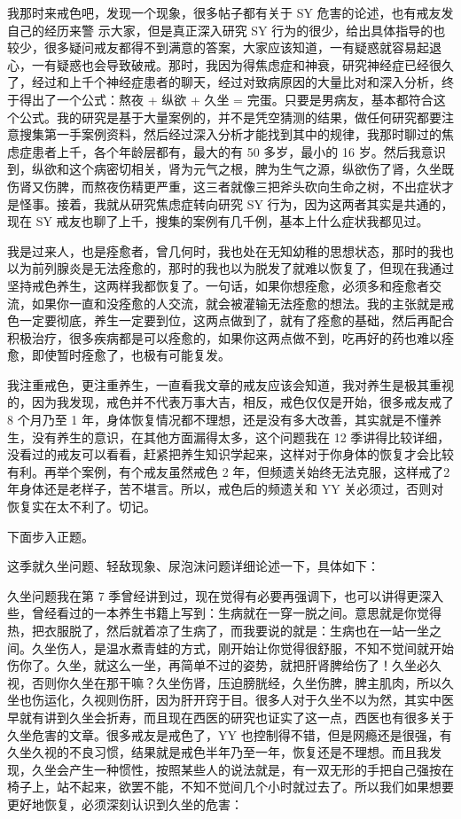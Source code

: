 \documentclass{ctexart}
\begin{document}
我那时来戒色吧，发现一个现象，很多帖子都有关于 SY 危害的论述，也有戒友发自己的经历来警 示大家，但是真正深入研究 SY 行为的很少，给出具体指导的也较少，很多疑问戒友都得不到满意的答案，大家应该知道，一有疑惑就容易起退心，一有疑惑也会导致破戒。那时，我因为得焦虑症和神衰，研究神经症已经很久了，经过和上千个神经症患者的聊天，经过对致病原因的大量比对和深入分析，终于得出了一个公式：熬夜 + 纵欲 + 久坐 = 完蛋。只要是男病友，基本都符合这个公式。我的研究是基于大量案例的，并不是凭空猜测的结果，做任何研究都要注意搜集第一手案例资料，然后经过深入分析才能找到其中的规律，我那时聊过的焦虑症患者上千，各个年龄层都有，最大的有 50 多岁，最小的 16 岁。然后我意识到，纵欲和这个病密切相关，肾为元气之根，脾为生气之源，纵欲伤了肾，久坐既伤肾又伤脾，而熬夜伤精更严重，这三者就像三把斧头砍向生命之树，不出症状才是怪事。接着，我就从研究焦虑症转向研究 SY 行为，因为这两者其实是共通的，现在 SY 戒友也聊了上千，搜集的案例有几千例，基本上什么症状我都见过。

我是过来人，也是痊愈者，曾几何时，我也处在无知幼稚的思想状态，那时的我也以为前列腺炎是无法痊愈的，那时的我也以为脱发了就难以恢复了，但现在我通过坚持戒色养生，这两样我都恢复了。一句话，如果你想痊愈，必须多和痊愈者交流，如果你一直和没痊愈的人交流，就会被灌输无法痊愈的想法。我的主张就是戒色一定要彻底，养生一定要到位，这两点做到了，就有了痊愈的基础，然后再配合积极治疗，很多疾病都是可以痊愈的，如果你这两点做不到，吃再好的药也难以痊愈，即使暂时痊愈了，也极有可能复发。

我注重戒色，更注重养生，一直看我文章的戒友应该会知道，我对养生是极其重视的，因为我发现，戒色并不代表万事大吉，相反，戒色仅仅是开始，很多戒友戒了 8 个月乃至 1 年，身体恢复情况都不理想，还是没有多大改善，其实就是不懂养生，没有养生的意识，在其他方面漏得太多，这个问题我在 12 季讲得比较详细，没看过的戒友可以看看，赶紧把养生知识学起来，这样对于你身体的恢复才会比较有利。再举个案例，有个戒友虽然戒色 2 年，但频遗关始终无法克服，这样戒了2年身体还是老样子，苦不堪言。所以，戒色后的频遗关和 YY 关必须过，否则对恢复实在太不利了。切记。

下面步入正题。

这季就久坐问题、轻敌现象、尿泡沫问题详细论述一下，具体如下：

久坐问题我在第 7 季曾经讲到过，现在觉得有必要再强调下，也可以讲得更深入些，曾经看过的一本养生书籍上写到：生病就在一穿一脱之间。意思就是你觉得热，把衣服脱了，然后就着凉了生病了，而我要说的就是：生病也在一站一坐之间。久坐伤人，是温水煮青蛙的方式，刚开始让你觉得很舒服，不知不觉间就开始伤你了。久坐，就这么一坐，再简单不过的姿势，就把肝肾脾给伤了！久坐必久视，否则你久坐在那干嘛？久坐伤肾，压迫膀胱经，久坐伤脾，脾主肌肉，所以久坐也伤运化，久视则伤肝，因为肝开窍于目。很多人对于久坐不以为然，其实中医早就有讲到久坐会折寿，而且现在西医的研究也证实了这一点，西医也有很多关于久坐危害的文章。很多戒友是戒色了，YY 也控制得不错，但是网瘾还是很强，有久坐久视的不良习惯，结果就是戒色半年乃至一年，恢复还是不理想。而且我发现，久坐会产生一种惯性，按照某些人的说法就是，有一双无形的手把自己强按在椅子上，站不起来，欲罢不能，不知不觉间几个小时就过去了。所以我们如果想要更好地恢复，必须深刻认识到久坐的危害：
\end{document}
